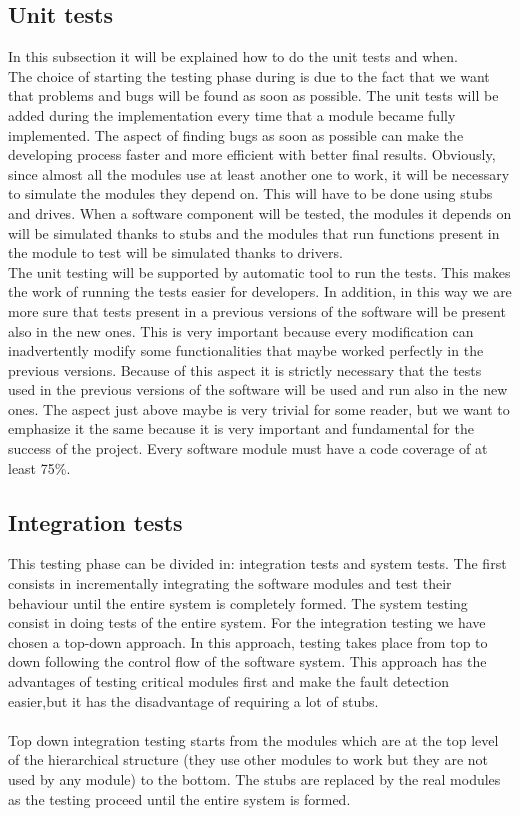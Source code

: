 \documentclass[titlepage]{article}
\begin{document}
\subsection{Unit tests}
In this subsection it will be explained how to do the unit tests and when.\\
The choice of starting the testing phase during is due to the fact that we want that problems and bugs will be found as soon as possible. The unit tests will be added during the implementation every time that a module became fully implemented. The aspect of finding bugs as soon as possible can make the developing process faster and more efficient with better final results. Obviously, since almost all the modules use at least another one to work, it will be necessary to simulate the modules they depend on. This will have to be done using stubs and drives. When a software component will be tested, the modules it depends on will be simulated thanks to stubs and the modules that run functions present in the module to test will be simulated thanks to drivers.\\
The unit testing will be supported by automatic tool to run the tests. This makes the work of running the tests easier for developers. In addition, in this way we are more sure that tests present in a previous versions of the software will be present also in the  new ones. This is very important because every modification can inadvertently modify some functionalities that maybe worked perfectly in the previous versions. Because of this aspect it is strictly necessary that the tests used in the previous versions of the software will be used and run also in the new ones. The aspect just above maybe is very trivial for some reader, but we want to emphasize it the same because it is very important and fundamental for the success of the project. Every software module must have a code coverage of at least 75\%.
\subsection{Integration tests}
This testing phase can be divided in: integration tests and system tests. The first consists in incrementally integrating the software modules and test their behaviour until the entire system is completely formed. The system testing consist in doing tests of the entire system. For the integration testing we have chosen a top-down approach. In this approach, testing takes place from top to down following the control flow of the software system. This approach has the advantages of testing critical modules first and make the fault detection easier,but it has the disadvantage of requiring a lot of  stubs. \\ \\
Top down integration testing starts from the modules which are at the top level of the hierarchical structure (they use other modules to work but they are not used by any module) to the bottom. The stubs are replaced by the real modules as the testing proceed until the entire system is formed.
\end{document}
